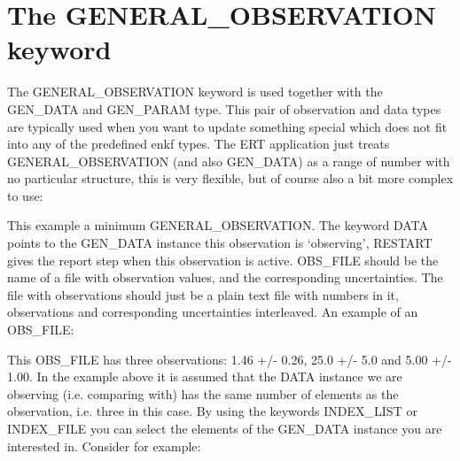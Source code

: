 \documentclass[a4paper,10pt,english]{sphinxmanual}
\begin{document}
\section{The GENERAL\_OBSERVATION keyword}
\label{\detokenize{observations/index:the-general-observation-keyword}}
The GENERAL\_OBSERVATION keyword is used together with the GEN\_DATA and
GEN\_PARAM type. This pair of observation and data types are typically
used when you want to update something special which does not fit into
any of the predefined enkf types. The ERT application just treats
GENERAL\_OBSERVATION (and also GEN\_DATA) as a range of number with no
particular structure, this is very flexible, but of course also a bit
more complex to use:

%
\begin{sphinxVerbatim}[commandchars=\\\{\}]
 
         
      
     
\end{sphinxVerbatim}

This example a minimum GENERAL\_OBSERVATION. The keyword DATA points to
the GEN\_DATA instance this observation is ‘observing’, RESTART gives
the report step when this observation is active. OBS\_FILE should be
the name of a file with observation values, and the corresponding
uncertainties. The file with observations should just be a plain text
file with numbers in it, observations and corresponding uncertainties
interleaved. An example of an OBS\_FILE:

%
\begin{sphinxVerbatim}[commandchars=\\\{\}]
 
 
 
\end{sphinxVerbatim}

This OBS\_FILE has three observations: 1.46 +/- 0.26, 25.0 +/- 5.0 and
5.00 +/- 1.00. In the example above it is assumed that the DATA
instance we are observing (i.e. comparing with) has the same number of
elements as the observation, i.e. three in this case. By using the
keywords INDEX\_LIST or INDEX\_FILE you can select the elements of the
GEN\_DATA instance you are interested in. Consider for example:
\end{document}

